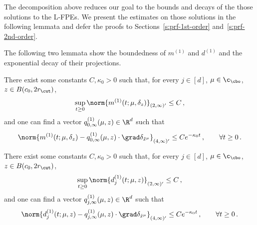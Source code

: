 \documentclass{amsart}
\begin{document}
The decomposition above reduces our goal to the bounds and decays of the those solutions to the L-FPEs. 
We present the estimates on those solutions in the following lemmata and defer the proofs to Sections~\ref{s:prf-1st-order} and~\ref{s:prf-2nd-order}.

The following two lemmata show the boundedness of $m^{(1)}$ and $d^{(1)}$ and the exponential decay of their projections. 
\begin{lemma}
\label{l:m1-bound}
	There exist some constants $C, \kappa_0 > 0$ such that, for every $j \in [d]$, $\mu \in \c_\cbo$, $z \in B(c_0, 2r_\cut)$, 
	\begin{equation*}
		\sup_{t \ge 0} \norm{m^{(1)}(t;\mu,\delta_z)}_{(2,\infty)'} \le C \,,
	\end{equation*}
	and one can find a vector $q^{(1)}_{0,\infty}(\mu,z) \in \R^d$ such that 
	\begin{equation*}
		\norm{m^{(1)}(t;\mu,\delta_z) - q^{(1)}_{0,\infty}(\mu,z) \cdot \grad \delta_{\tilde x^\mu} }_{(4,\infty)'} \le C e^{-\kappa_0 t} \,, \qquad \forall t \ge 0 \,.
	\end{equation*}
\end{lemma}
\begin{lemma}
\label{l:d1-bound}
	There exist some constants $C, \kappa_0 > 0$ such that, for every $j \in [d]$, $\mu \in \c_\cbo$, $z \in B(c_0, 2r_\cut)$, 
	\begin{equation*}
		\sup_{t \ge 0} \norm{d^{(1)}_j(t;\mu,z)}_{(2,\infty)'} \le C \,,
	\end{equation*}
	and one can find a vector $q^{(1)}_{j,\infty}(\mu,z) \in \R^d$ such that 
	\begin{equation*}
		\norm{d^{(1)}_j(t;\mu,z) - q^{(1)}_{j,\infty}(\mu,z) \cdot \grad \delta_{\tilde x^\mu} }_{(4,\infty)'} \le C e^{-\kappa_0 t} \,, \qquad \forall t \ge 0 \,.
	\end{equation*}
\end{lemma}
\end{document}
